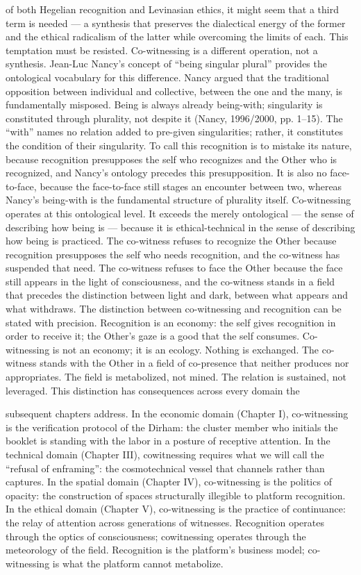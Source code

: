 of both Hegelian recognition and Levinasian ethics, it might seem that a third term is needed — a synthesis that preserves the dialectical energy of the former and the ethical radicalism of the latter while overcoming the limits of each. This temptation must be resisted. Co-witnessing is a different operation, not a synthesis. Jean-Luc Nancy’s concept of “being singular plural” provides the ontological vocabulary for this difference. Nancy argued that the traditional opposition between individual and collective, between the one and the many, is fundamentally misposed. Being is always already being-with; singularity is constituted through plurality, not despite it (Nancy, 1996/2000, pp. 1–15). The “with” names no relation added to pre-given singularities; rather, it constitutes the condition of their singularity. To call this recognition is to mistake its nature, because recognition presupposes the self who recognizes and the Other who is recognized, and Nancy’s ontology precedes this presupposition. It is also no face-to-face, because the face-to-face still stages an encounter between two, whereas Nancy’s being-with is the fundamental structure of plurality itself. Co-witnessing operates at this ontological level. It exceeds the merely ontological — the sense of describing how being is — because it is ethical-technical in the sense of describing how being is practiced. The co-witness refuses to recognize the Other because recognition presupposes the self who needs recognition, and the co-witness has suspended that need. The co-witness refuses to face the Other because the face still appears in the light of consciousness, and the co-witness stands in a field that precedes the distinction between light and dark, between what appears and what withdraws. The distinction between co-witnessing and recognition can be stated with precision. Recognition is an economy: the self gives recognition in order to receive it; the Other’s gaze is a good that the self consumes. Co-witnessing is not an economy; it is an ecology. Nothing is exchanged. The co-witness stands with the Other in a field of co-presence that neither produces nor appropriates. The field is metabolized, not mined. The relation is sustained, not leveraged. This distinction has consequences across every domain the

subsequent chapters address. In the economic domain (Chapter I), co-witnessing is the verification protocol of the Dirham: the cluster member who initials the booklet is standing with the labor in a posture of receptive attention. In the technical domain (Chapter III), cowitnessing requires what we will call the “refusal of enframing”: the cosmotechnical vessel that channels rather than captures. In the spatial domain (Chapter IV), co-witnessing is the politics of opacity: the construction of spaces structurally illegible to platform recognition. In the ethical domain (Chapter V), co-witnessing is the practice of continuance: the relay of attention across generations of witnesses. Recognition operates through the optics of consciousness; cowitnessing operates through the meteorology of the field. Recognition is the platform’s business model; co-witnessing is what the platform cannot metabolize.

